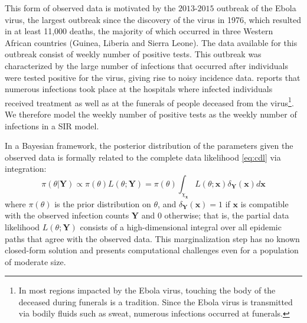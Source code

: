 \documentclass[12pt]{article}
\begin{document}
This form of observed data is motivated by the $2013$-$2015$ outbreak of the Ebola virus, the largest outbreak since the discovery of the virus in 1976, which resulted in at least 11,000 deaths, the majority of which occurred in three Western African countries (Guinea, Liberia and Sierra Leone). The data available for this outbreak consist of weekly number of positive tests. This outbreak was characterized by the large number of infections that occurred after individuals were tested positive for the virus, giving rise to noisy incidence data. \cite{Coltart.2017} reports that numerous infections took place at the hospitals where infected individuals received treatment as well as at the funerals of people deceased from the virus\footnote{In most regions impacted by the Ebola virus, touching the body of the deceased during funerals is a tradition. Since the Ebola virus is transmitted via bodily fluids such as sweat, numerous infections occurred at funerals.}. We therefore model the weekly number of positive tests as the weekly number of infections in a SIR model.


In a Bayesian framework, the posterior distribution of the parameters given the observed data is formally related to the complete data likelihood \eqref{eq:cdl} via integration:
\begin{equation}
	\label{eq:pdl}
	\pi(\theta|\mathbf{Y}) 
	\propto \pi(\theta) L(\theta; \mathbf{Y}) = \pi(\theta) \int_{\chi_\mathbf{x}} L(\theta; \mathbf{x}) \delta_{\mathbf{Y}}(\mathbf{x}) d\mathbf{x}
\end{equation}
where $\pi(\theta)$ is the prior distribution on $\theta$, and
$\delta_{\mathbf{Y}}(\mathbf{x}) = 1$ if $\mathbf{x}$ is compatible with the observed infection counts $\mathbf{Y}$ and $0$ otherwise; that is, the partial data likelihood $L(\theta; \mathbf{Y})$ consists of a high-dimensional integral over all epidemic paths that agree with the observed data. This marginalization step has no known closed-form solution and presents computational challenges even for a population of moderate size.
\end{document}
